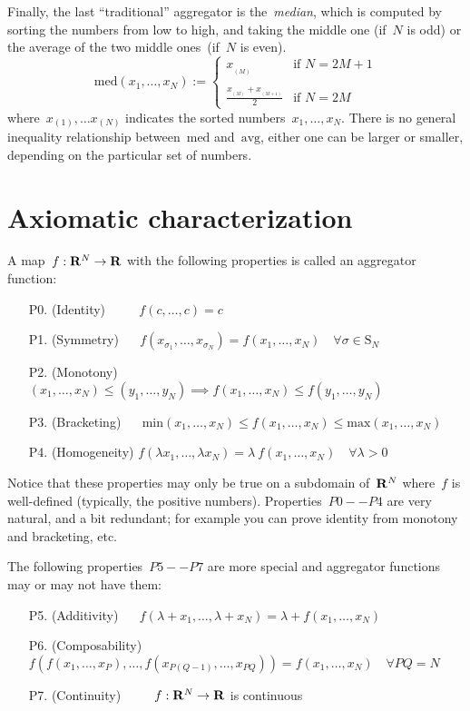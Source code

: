 Finally, the last ``traditional'' aggregator is the~\emph{median},
which is computed by sorting the numbers from low to high, and taking
the middle one (if~$N$ is odd) or the average of the two middle
ones~(if~$N$ is even).
\[
	\mathrm{med}(x_1,\ldots,x_N):=
	\begin{cases}
		x_{{}_{(M)}} & \textrm{if~$N=2M+1$} \\
		&\\
		\displaystyle\frac{x_{{}_{(M)}}
		+ x_{{}_{(M+1)}}}{2}
			& \textrm{if~$N=2M$}
	\end{cases}
\]
where~$x_{(1)},\ldots x_{(N)}$ indicates the sorted
numbers~$x_1,\ldots,x_N$.  There is no general inequality
relationship between~$\mathrm{med}$ and~$\mathrm{avg}$, either one can be larger or
smaller, depending on the particular set of numbers.


\section{Axiomatic characterization}

A map~$f:\mathbf{R}^N\to\mathbf{R}$ with the following properties
is called an aggregator function:
\begin{itemize}
	\item[P0.]
		(Identity)
		$\qquad$
		$f(c,\ldots,c)=c$
	\item[P1.]
		(Symmetry)
		$\quad$
		$f(x_{\sigma_1},\ldots,x_{\sigma_N})=f(x_1,\ldots,x_N)
		\quad
		\forall\sigma\in\mathrm{S}_N$
	\item[P2.]
		(Monotony)
		$\quad$
		$(x_1,\ldots,x_N)\le(y_1,\ldots,y_N)
		\implies
		f(x_1,\ldots,x_N)\le f(y_1,\ldots,y_N)$
	\item[P3.]
		(Bracketing)
		$\quad$
		$\mathrm{min}(x_1,\ldots,x_N)
		\le f(x_1,\ldots,x_N)
		\le \mathrm{max}(x_1,\ldots,x_N)$
	\item[P4.]
		(Homogeneity)
		$f(\lambda x_1,\ldots,\lambda x_N)
		=\lambda\ f(x_1,\ldots,x_N)
		\quad\forall\lambda >0$
\end{itemize}

Notice that these properties may only be true on a subdomain
of~$\mathbf{R}^N$ where~$f$ is well-defined (typically, the positive
numbers).  Properties~$P0--P4$ are very natural, and a bit redundant;
for example you can prove identity from monotony and bracketing, etc.

The following properties~$P5--P7$ are more special and aggregator
functions may or may not have them:

\begin{itemize}
	\item[P5.]
		(Additivity)
		$\quad$
		$f(\lambda+x_1,\ldots,\lambda+x_N)
		=\lambda+f(x_1,\ldots,x_N)$
	\item[P6.]
		(Composability)
		$f\left(f(x_1,\ldots,x_P),\ldots,f(x_{P(Q-1)},\ldots,x_{PQ})\right)
		=f(x_1,\ldots,x_N)\quad\forall PQ=N$
	\item[P7.]
		(Continuity)
		$\qquad$
		$f:\mathbf{R}^N\to\mathbf{R}$ is continuous
\end{itemize}


